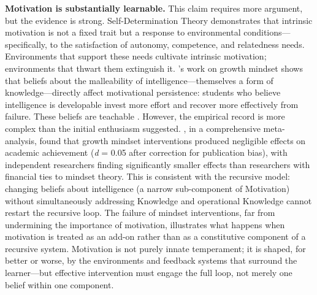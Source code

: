 \documentclass[12pt,a4paper]{article}
\begin{document}
\textbf{Motivation is substantially learnable.} This claim requires more argument, but the evidence is strong. Self-Determination Theory \citep{DeciRyan2000} demonstrates that intrinsic motivation is not a fixed trait but a response to environmental conditions---\hspace{0pt}specifically, to the satisfaction of autonomy, competence, and relatedness needs. Environments that support these needs cultivate intrinsic motivation; environments that thwart them extinguish it. \citeauthor{Dweck2006}'s \citeyearpar{Dweck2006} work on growth mindset shows that beliefs about the malleability of intelligence---\hspace{0pt}themselves a form of knowledge---\hspace{0pt}directly affect motivational persistence: students who believe intelligence is developable invest more effort and recover more effectively from failure. These beliefs are teachable \citep{YeagerDweck2012}. However, the empirical record is more complex than the initial enthusiasm suggested. \citet{MacnamaraBurgoyne2023}, in a comprehensive meta-analysis, found that growth mindset interventions produced negligible effects on academic achievement (\emph{d} = 0.05 after correction for publication bias), with independent researchers finding significantly smaller effects than researchers with financial ties to mindset theory. This is consistent with the recursive model: changing beliefs about intelligence (a narrow sub-component of Motivation) without simultaneously addressing Knowledge and operational Knowledge cannot restart the recursive loop. The failure of mindset interventions, far from undermining the importance of motivation, illustrates what happens when motivation is treated as an add-on rather than as a constitutive component of a recursive system. Motivation is not purely innate temperament; it is shaped, for better or worse, by the environments and feedback systems that surround the learner---\hspace{0pt}but effective intervention must engage the full loop, not merely one belief within one component.
\end{document}
